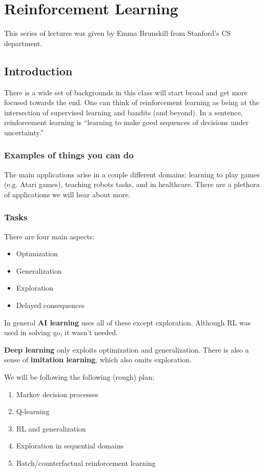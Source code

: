 \documentclass[12pt]{article}
\begin{document}
\pagebreak

\section{Reinforcement Learning}
This series of lectures was given by Emma Brunskill from Stanford's CS department.

\subsection{Introduction}
There is a wide set of backgrounds in this class will start broad and get more focused towards the end. One can think of reinforcement learning as being at the intersection of supervised learning and bandits (and beyond). In a sentence, 
reinforcement learning is ``learning to make good sequences of decisions under uncertainty.''

\subsubsection{Examples of things you can do}
The main applications arise in a couple different domains: learning to play games (e.g. Atari games), teaching robots tasks, and in healthcare.
There are a plethora of applications we will hear about more.

\subsubsection{Tasks}
There are four main aspects:
\begin{itemize}
	\item Optimization
	\item Generalization
	\item Exploration 
	\item Delayed consequences
\end{itemize}

In general \textbf{AI learning} uses all of these except exploration. Although RL was used in solving go, it wasn't needed.

\textbf{Deep learning} only exploits optimization and generalization. There is also a sense of \textbf{imitation learning}, which also omits exploration.

We will be following the following (rough) plan:
\begin{enumerate}
	\item Markov decision processes
	\item Q-learning
	\item RL and generalization
	\item Exploration in sequential domains 
	\item Batch/counterfactual reinforcement learning
\end{enumerate}
\end{document}
